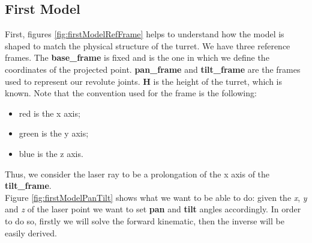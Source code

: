 \subsection{First Model}\label{subs:firstModel}
First, figures \ref{fig:firstModelRefFrame} helps to understand how the model is shaped to match the physical structure of the turret. We have three reference frames. The \textbf{base\_frame} is fixed and is the one in which we define the coordinates of the projected point. \textbf{pan\_frame} and \textbf{tilt\_frame} are the frames used to represent our revolute joints.
\textbf{H} is the height of the turret, which is known. Note that the convention used for the frame is the following:
\begin{itemize}
    \item red is the x axis;
    \item green is the y axis;
    \item blue is the z axis.
\end{itemize}
Thus, we consider the laser ray to be a prolongation of the x axis of the \textbf{tilt\_frame}. \\
Figure \ref{fig:firstModelPanTilt} shows what we want to be able to do: given the \textit{x}, \textit{y} and \textit{z} of the laser point we want to set \textbf{pan} and \textbf{tilt} angles accordingly. In order to do so, firstly we will solve the forward kinematic, then the inverse will be easily derived.
